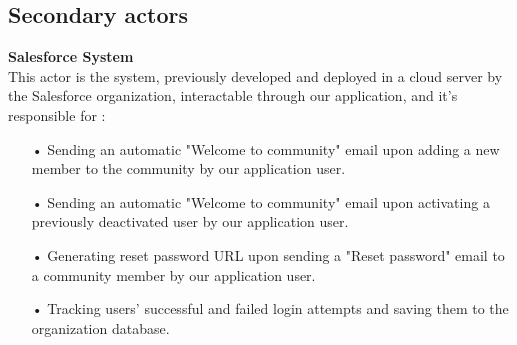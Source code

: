\subsection*{Secondary actors}
\textbf{Salesforce System}\\
This actor is the system, previously developed and deployed in a cloud server by the Salesforce organization, interactable through our application, and it's responsible for :
\begin{itemize}
\item[•] Sending an automatic "Welcome to community" email upon adding a new member to the community by our application user.  
\item[•] Sending an automatic "Welcome to community" email upon activating a previously deactivated user by our application user.
\item[•] Generating reset password URL upon sending a "Reset password" email to a community member by our application user.
\item[•] Tracking users' successful and failed login attempts and saving them to the organization database.

\end{itemize}
